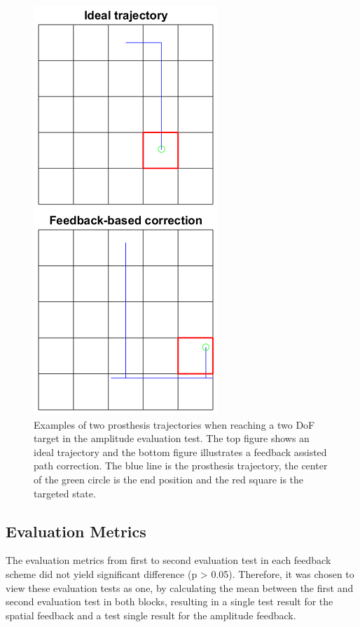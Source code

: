 \begin{figure}[h]                 
	\includegraphics[width=.7\textwidth]{figures/trajectories}
	\caption{Examples of two prosthesis trajectories when reaching a two DoF target in the amplitude evaluation test. The top figure shows an ideal trajectory and the bottom figure illustrates a feedback assisted path correction. The blue line is the prosthesis trajectory, the center of the green circle is the end position and the red square is the targeted state.}
	\label{fig:pa:trajec} 
\end{figure}

\subsection{Evaluation Metrics}
The evaluation metrics from first to second evaluation test in each feedback scheme did not yield significant difference (p > 0.05). Therefore, it was chosen to view these evaluation tests as one, by calculating the mean between the first and second evaluation test in both blocks, resulting in a single test result for the spatial feedback and a test single result for the amplitude feedback. 

